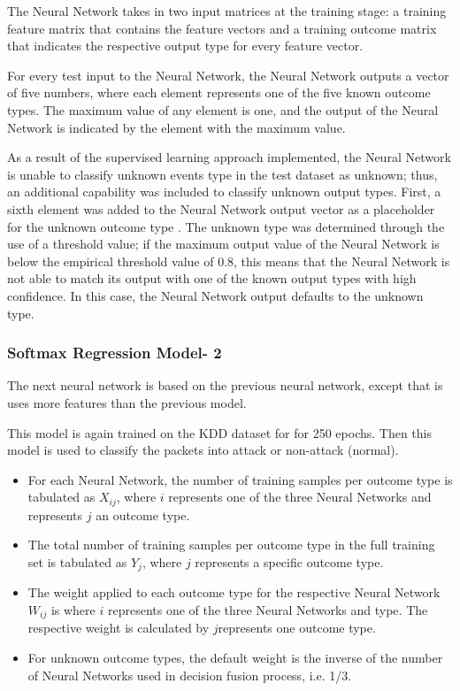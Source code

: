 \documentclass[12pt]{article}
\theoremstyle{definition}
\begin{document}
			The Neural Network takes in two input matrices at the training stage: a training feature matrix
			that contains the feature vectors and a training outcome matrix that indicates the
			respective output type for every feature vector.
			
			For every test input to the Neural Network, the Neural Network outputs a vector of five numbers, where
			each element represents one of the five known outcome types. The maximum value of
			any element is one, and the output of the Neural Network is indicated by the element with the
			maximum value.
			
			As a result of the supervised learning approach implemented, the Neural Network is unable to
			classify unknown events type in the test dataset as unknown; thus, an additional
			capability was included to classify unknown output types. First, a sixth element was
			added to the Neural Network output vector as a placeholder for the unknown outcome type \cite{Iqbal2016}. The
			unknown type was determined through the use of a threshold value; if the maximum
			output value of the Neural Network is below the empirical threshold value of 0.8, this means that the Neural Network is not able to match its output with one of the known output types with high
			confidence. In this case, the Neural Network output defaults to the unknown type.
			
			
			\subsubsection{Softmax Regression Model- 2}
			The next neural network is based on the previous neural network, except that is uses more features than the previous model. 
			
			This model is again trained on the KDD dataset for for 250 epochs. Then this model is used to classify the packets into attack or non-attack (normal).
			\begin{itemize}
				\item For each Neural Network, the number of training samples per outcome type is
				tabulated as $X_{ij} $, where $ i $ represents one of the three Neural Networks and represents $ j $ an outcome type.
				
				\item The total number of training samples per outcome type in the full training
				set is tabulated as $ Y_j $, where $ j $ represents a specific outcome type.
				
				\item The weight applied to each outcome type for the respective Neural Network $ W_{ij} $ is
				where $ i $ represents one of the three Neural Networks and type. The respective weight is calculated by $ j $represents one outcome type.
				\item For unknown outcome types, the default weight is the inverse of the
				number of Neural Networks used in decision fusion process, i.e. 1/3.
			\end{itemize}
		
\end{document}
